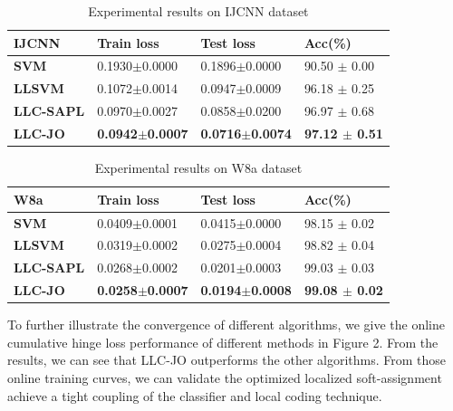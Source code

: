\documentclass{llncs}
\begin{document}
	\begin{table}
		\begin{tabu} to \textwidth {|X[c]| X[c]| X[c]| X[c]|}
			\hline
			IJCNN              & Train loss & Test loss & Acc(\%) \\
			\hline
			\textbf{SVM} 		   	&0.1930$\pm$0.0000  &0.1896$\pm$0.0000  & 90.50 $\pm$ 0.00  \\ \hline
			\textbf{LLSVM}     		&0.1072$\pm$0.0014  &0.0947$\pm$0.0009  & 96.18 $\pm$ 0.25  \\ \hline
			\textbf{LLC-SAPL}       &0.0970$\pm$0.0027  &0.0858$\pm$0.0200  & 96.97 $\pm$ 0.68  \\ \hline
			\textbf{LLC-JO}         &\textbf{0.0942$\pm$0.0007}  &\textbf{0.0716$\pm$0.0074}  & \textbf{97.12 $\pm$ 0.51}   \\ \hline
		\end{tabu}
		\caption{Experimental results on IJCNN dataset}
	\end{table}

	\begin{table}
		\begin{tabu} to \textwidth {|X[c]| X[c]| X[c]| X[c]|}
			\hline
			W8a              & Train loss & Test loss & Acc(\%) \\
			\hline
			\textbf{SVM} 		   	&0.0409$\pm$0.0001  &0.0415$\pm$0.0000  &98.15 $\pm$ 0.02   \\ \hline
			\textbf{LLSVM}     		&0.0319$\pm$0.0002  &0.0275$\pm$0.0004  &98.82 $\pm$ 0.04   \\ \hline
			\textbf{LLC-SAPL}       &0.0268$\pm$0.0002  &0.0201$\pm$0.0003  &99.03 $\pm$ 0.03   \\ \hline
			\textbf{LLC-JO}         &\textbf{0.0258$\pm$0.0007}  &\textbf{0.0194$\pm$0.0008}  &\textbf{99.08 $\pm$ 0.02}   \\ \hline
		\end{tabu}
		\caption{Experimental results on W8a dataset}
	\end{table}

	To further illustrate the convergence of different algorithms, we give the online cumulative hinge loss performance of different methods in Figure 2. From the results, we can see that LLC-JO outperforms the other algorithms. From those online training curves, we can validate the optimized localized soft-assignment achieve a tight coupling of the classifier and local coding technique.
	
\end{document}
